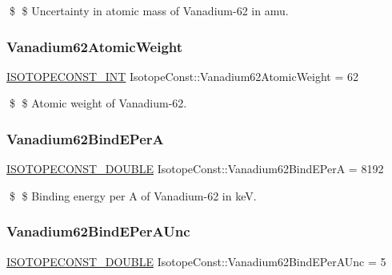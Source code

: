 \$ \$ Uncertainty in atomic mass of Vanadium-\/62 in amu. \mbox{\label{group___isotope_const-_vanadium-_v62_gad12f48cba044b40662072b455e52960a}} 
\subsubsection{\texorpdfstring{Vanadium62\+Atomic\+Weight}{Vanadium62AtomicWeight}}
{\footnotesize\ttfamily \mbox{\hyperlink{group___isotope_const-_macros_ga5f18360b3e99483a35c32d789e62621c}{I\+S\+O\+T\+O\+P\+E\+C\+O\+N\+S\+T\+\_\+\+I\+NT}} Isotope\+Const\+::\+Vanadium62\+Atomic\+Weight = 62}

\$ \$ Atomic weight of Vanadium-\/62. \mbox{\label{group___isotope_const-_vanadium-_v62_gafff8340be42e626d60418a7808d16187}} 
\subsubsection{\texorpdfstring{Vanadium62\+Bind\+E\+PerA}{Vanadium62BindEPerA}}
{\footnotesize\ttfamily \mbox{\hyperlink{group___isotope_const-_macros_ga8f45a7272ce02c0b4c65c44636ed719a}{I\+S\+O\+T\+O\+P\+E\+C\+O\+N\+S\+T\+\_\+\+D\+O\+U\+B\+LE}} Isotope\+Const\+::\+Vanadium62\+Bind\+E\+PerA = 8192}

\$ \$ Binding energy per A of Vanadium-\/62 in keV. \mbox{\label{group___isotope_const-_vanadium-_v62_gaa6e50e35c8041b4427d41df13a736df1}} 
\subsubsection{\texorpdfstring{Vanadium62\+Bind\+E\+Per\+A\+Unc}{Vanadium62BindEPerAUnc}}
{\footnotesize\ttfamily \mbox{\hyperlink{group___isotope_const-_macros_ga8f45a7272ce02c0b4c65c44636ed719a}{I\+S\+O\+T\+O\+P\+E\+C\+O\+N\+S\+T\+\_\+\+D\+O\+U\+B\+LE}} Isotope\+Const\+::\+Vanadium62\+Bind\+E\+Per\+A\+Unc = 5}

